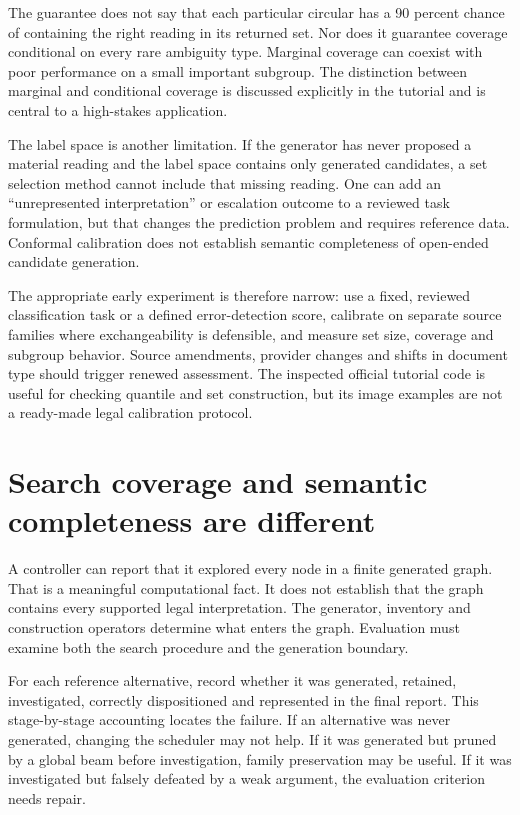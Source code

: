 The guarantee does not say that each particular circular has a 90 percent chance
of containing the right reading in its returned set. Nor does it guarantee
coverage conditional on every rare ambiguity type. Marginal coverage can coexist
with poor performance on a small important subgroup. The distinction between
marginal and conditional coverage is discussed explicitly in the tutorial
\citep[section 3]{conformal2022} and is central to a high-stakes application.

The label space is another limitation. If the generator has never proposed a
material reading and the label space contains only generated candidates, a set
selection method cannot include that missing reading. One can add an
``unrepresented interpretation'' or escalation outcome to a reviewed task
formulation, but that changes the prediction problem and requires reference data.
Conformal calibration does not establish semantic completeness of open-ended
candidate generation.

The appropriate early experiment is therefore narrow: use a fixed, reviewed
classification task or a defined error-detection score, calibrate on separate
source families where exchangeability is defensible, and measure set size,
coverage and subgroup behavior. Source amendments, provider changes and shifts in
document type should trigger renewed assessment. The inspected official tutorial
code is useful for checking quantile and set construction, but its image examples
are not a ready-made legal calibration protocol.

\section{Search coverage and semantic completeness are different}
\label{merge:M09:10}


A controller can report that it explored every node in a finite generated graph.
That is a meaningful computational fact. It does not establish that the graph
contains every supported legal interpretation. The generator, inventory and
construction operators determine what enters the graph. Evaluation must examine
both the search procedure and the generation boundary.

For each reference alternative, record whether it was generated, retained,
investigated, correctly dispositioned and represented in the final report. This
stage-by-stage accounting locates the failure. If an alternative was never
generated, changing the scheduler may not help. If it was generated but pruned by
a global beam before investigation, family preservation may be useful. If it was
investigated but falsely defeated by a weak argument, the evaluation criterion
needs repair.

